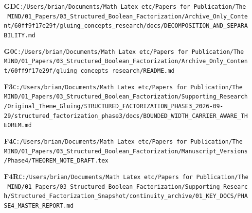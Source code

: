 \documentclass[10pt,letterpaper]{article}
\begin{document}
\noindent\textbf{GD}\quad \texttt{C:/\allowbreak{}Users/\allowbreak{}brian/\allowbreak{}Documents/\allowbreak{}Math\ Latex\ etc/\allowbreak{}Papers\ for\ Publication/\allowbreak{}The\ MIND/\allowbreak{}01\_\allowbreak{}Papers/\allowbreak{}03\_\allowbreak{}Structured\_\allowbreak{}Boolean\_\allowbreak{}Factorization/\allowbreak{}Archive\_\allowbreak{}Only\_\allowbreak{}Content/\allowbreak{}60ff9f17e29f/\allowbreak{}gluing\_\allowbreak{}concepts\_\allowbreak{}research/\allowbreak{}docs/\allowbreak{}DECOMPOSITION\_\allowbreak{}AND\_\allowbreak{}SEPARABILITY.md}\par
\noindent\textbf{G0}\quad \texttt{C:/\allowbreak{}Users/\allowbreak{}brian/\allowbreak{}Documents/\allowbreak{}Math\ Latex\ etc/\allowbreak{}Papers\ for\ Publication/\allowbreak{}The\ MIND/\allowbreak{}01\_\allowbreak{}Papers/\allowbreak{}03\_\allowbreak{}Structured\_\allowbreak{}Boolean\_\allowbreak{}Factorization/\allowbreak{}Archive\_\allowbreak{}Only\_\allowbreak{}Content/\allowbreak{}60ff9f17e29f/\allowbreak{}gluing\_\allowbreak{}concepts\_\allowbreak{}research/\allowbreak{}README.md}\par
\noindent\textbf{F3}\quad \texttt{C:/\allowbreak{}Users/\allowbreak{}brian/\allowbreak{}Documents/\allowbreak{}Math\ Latex\ etc/\allowbreak{}Papers\ for\ Publication/\allowbreak{}The\ MIND/\allowbreak{}01\_\allowbreak{}Papers/\allowbreak{}03\_\allowbreak{}Structured\_\allowbreak{}Boolean\_\allowbreak{}Factorization/\allowbreak{}Supporting\_\allowbreak{}Research/\allowbreak{}Original\_\allowbreak{}Theme\_\allowbreak{}Gluing/\allowbreak{}STRUCTURED\_\allowbreak{}FACTORIZATION\_\allowbreak{}PHASE3\_\allowbreak{}2026-\allowbreak{}09-\allowbreak{}29/\allowbreak{}structured\_\allowbreak{}factorization\_\allowbreak{}phase3/\allowbreak{}docs/\allowbreak{}BOUNDED\_\allowbreak{}WIDTH\_\allowbreak{}CARRIER\_\allowbreak{}AWARE\_\allowbreak{}THEOREM.md}\par
\noindent\textbf{F4}\quad \texttt{C:/\allowbreak{}Users/\allowbreak{}brian/\allowbreak{}Documents/\allowbreak{}Math\ Latex\ etc/\allowbreak{}Papers\ for\ Publication/\allowbreak{}The\ MIND/\allowbreak{}01\_\allowbreak{}Papers/\allowbreak{}03\_\allowbreak{}Structured\_\allowbreak{}Boolean\_\allowbreak{}Factorization/\allowbreak{}Manuscript\_\allowbreak{}Versions/\allowbreak{}Phase4/\allowbreak{}THEOREM\_\allowbreak{}NOTE\_\allowbreak{}DRAFT.tex}\par
\noindent\textbf{F4R}\quad \texttt{C:/\allowbreak{}Users/\allowbreak{}brian/\allowbreak{}Documents/\allowbreak{}Math\ Latex\ etc/\allowbreak{}Papers\ for\ Publication/\allowbreak{}The\ MIND/\allowbreak{}01\_\allowbreak{}Papers/\allowbreak{}03\_\allowbreak{}Structured\_\allowbreak{}Boolean\_\allowbreak{}Factorization/\allowbreak{}Supporting\_\allowbreak{}Research/\allowbreak{}Structured\_\allowbreak{}Factorization\_\allowbreak{}Snapshot/\allowbreak{}continuity\_\allowbreak{}archive/\allowbreak{}01\_\allowbreak{}KEY\_\allowbreak{}DOCS/\allowbreak{}PHASE4\_\allowbreak{}MASTER\_\allowbreak{}REPORT.md}\par
\end{document}
